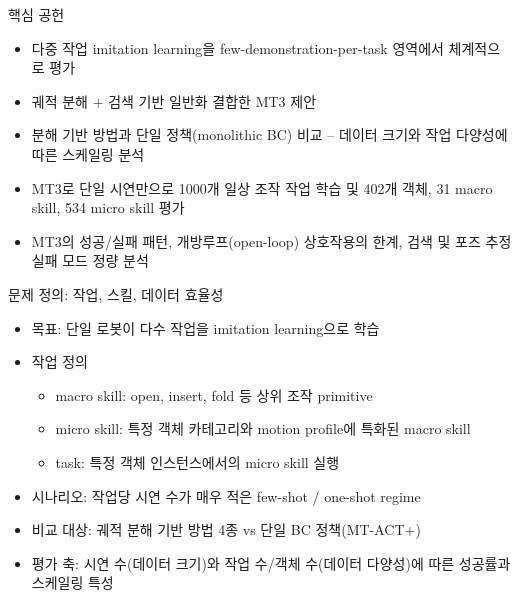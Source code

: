 \documentclass[aspectratio=169]{beamer}
\begin{document}
\begin{frame}{핵심 공헌}
  \small
  \begin{itemize}
    \item 다중 작업 imitation learning을 few-demonstration-per-task 영역에서 체계적으로 평가
    \item 궤적 분해 + 검색 기반 일반화 결합한 MT3 제안
    \item 분해 기반 방법과 단일 정책(monolithic BC) 비교 – 데이터 크기와 작업 다양성에 따른 스케일링 분석
    \item MT3로 단일 시연만으로 1000개 일상 조작 작업 학습 및 402개 객체, 31 macro skill, 534 micro skill 평가
    \item MT3의 성공/실패 패턴, 개방루프(open-loop) 상호작용의 한계, 검색 및 포즈 추정 실패 모드 정량 분석
  \end{itemize}
\end{frame}

\begin{frame}{문제 정의: 작업, 스킬, 데이터 효율성}
  \small
  \begin{itemize}
    \item 목표: 단일 로봇이 다수 작업을 imitation learning으로 학습
    \item 작업 정의
    \begin{itemize}
      \item macro skill: open, insert, fold 등 상위 조작 primitive
      \item micro skill: 특정 객체 카테고리와 motion profile에 특화된 macro skill
      \item task: 특정 객체 인스턴스에서의 micro skill 실행
    \end{itemize}
    \item 시나리오: 작업당 시연 수가 매우 적은 few-shot / one-shot regime
    \item 비교 대상: 궤적 분해 기반 방법 4종 vs 단일 BC 정책(MT-ACT+)
    \item 평가 축: 시연 수(데이터 크기)와 작업 수/객체 수(데이터 다양성)에 따른 성공률과 스케일링 특성
  \end{itemize}
\end{frame}
\end{document}
